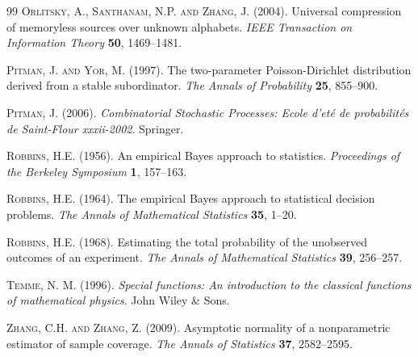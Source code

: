\documentclass{article}
\newcommand{\1}{\boldsymbol{1}}
\theoremstyle{plain}
\begin{document}
\begin{thebibliography}{99}
\textsc{Orlitsky, A., Santhanam, N.P. and Zhang, J.} (2004). 
Universal compression of memoryless sources over unknown alphabets. \textit{IEEE Transaction on Information Theory} \textbf{50}, 1469--1481.

\textsc{Pitman, J. and Yor, M.} (1997). The two-parameter Poisson-Dirichlet distribution derived from a stable subordinator. \textit{The Annals of Probability} \textbf{25}, 855--900.

\textsc{Pitman, J.} (2006). \textit{Combinatorial Stochastic Processes: Ecole d'eté de probabilités de Saint-Flour xxxii-2002}. Springer.

\textsc{Robbins, H.E.} (1956). An empirical Bayes approach to statistics. \textit{Proceedings of the Berkeley Symposium} \textbf{1}, 157--163.

\textsc{Robbins, H.E.} (1964). The empirical Bayes approach to statistical decision problems. \textit{The Annals of Mathematical Statistics} \textbf{35}, 1--20.

\textsc{Robbins, H.E.} (1968). Estimating the total probability of the unobserved outcomes of an experiment. \textit{The Annals of Mathematical Statistics} \textbf{39}, 256--257.

\textsc{Temme, N. M.} (1996). \textit{Special functions: An introduction to the classical functions of mathematical physics}. John Wiley \& Sons.

\textsc{Zhang, C.H. and Zhang, Z.} (2009). Asymptotic normality of a nonparametric estimator of sample coverage. \textit{The Annals of Statistics} \textbf{37}, 2582--2595.

\end{thebibliography}
\end{document}
